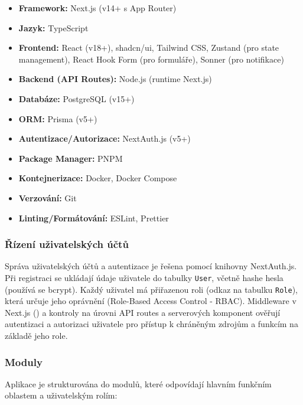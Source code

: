 \documentclass[12pt, a4paper]{article}
\begin{document}
\begin{itemize}
    \item \textbf{Framework:} Next.js (v14+ s App Router)
    \item \textbf{Jazyk:} TypeScript
    \item \textbf{Frontend:} React (v18+), shadcn/ui, Tailwind CSS, Zustand (pro state management), React Hook Form (pro formuláře), Sonner (pro notifikace)
    \item \textbf{Backend (API Routes):} Node.js (runtime Next.js)
    \item \textbf{Databáze:} PostgreSQL (v15+)
    \item \textbf{ORM:} Prisma (v5+)
    \item \textbf{Autentizace/Autorizace:} NextAuth.js (v5+)
    \item \textbf{Package Manager:} PNPM
    \item \textbf{Kontejnerizace:} Docker, Docker Compose
    \item \textbf{Verzování:} Git
    \item \textbf{Linting/Formátování:} ESLint, Prettier
\end{itemize}

\subsubsection{Řízení uživatelských účtů}
\label{subsubsec:rizeni_uctu}

Správa uživatelských účtů a autentizace je řešena pomocí knihovny NextAuth.js. Při registraci se ukládají údaje uživatele do tabulky \texttt{User}, včetně hashe hesla (používá se bcrypt). Každý uživatel má přiřazenou roli (odkaz na tabulku \texttt{Role}), která určuje jeho oprávnění (Role-Based Access Control - RBAC). Middleware v Next.js () a kontroly na úrovni API routes a serverových komponent ověřují autentizaci a autorizaci uživatele pro přístup k chráněným zdrojům a funkcím na základě jeho role.

\subsubsection{Moduly}
\label{subsubsec:moduly}

Aplikace je strukturována do modulů, které odpovídají hlavním funkčním oblastem a uživatelským rolím:
\end{document}
